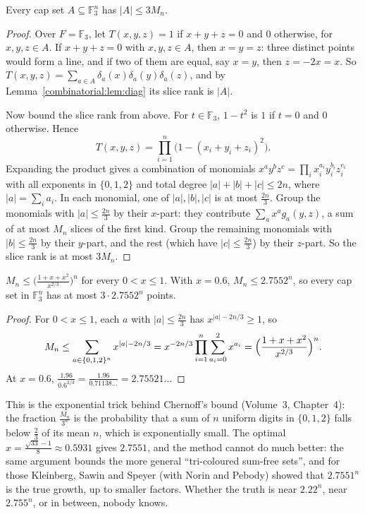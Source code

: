 \begin{theorem}\label{combinatorial:thm:capset}
Every cap set $A\subseteq\mathbb F_3^n$ has $|A|\le3M_n$.
\end{theorem}
\begin{proof}
Over $F=\mathbb F_3$, let $T(x,y,z)=1$ if $x+y+z=0$ and $0$ otherwise, for $x,y,z\in A$. If $x+y+z=0$ with $x,y,z\in A$, then $x=y=z$: three distinct points would form a line, and if two of them are equal,
say $x=y$, then $z=-2x=x$. So $T(x,y,z)=\sum_{a\in A}\delta_a(x)\delta_a(y)\delta_a(z)$, and by Lemma~\ref{combinatorial:lem:diag} its slice rank is $|A|$.

Now bound the slice rank from above. For $t\in\mathbb F_3$, $1-t^2$ is $1$ if $t=0$ and $0$ otherwise. Hence
\[
T(x,y,z)=\prod_{i=1}^n\bigl(1-(x_i+y_i+z_i)^2\bigr).
\]
Expanding the product gives a combination of monomials $x^ay^bz^c=\prod_ix_i^{a_i}y_i^{b_i}z_i^{c_i}$ with all exponents in $\{0,1,2\}$ and total degree $|a|+|b|+|c|\le2n$, where $|a|=\sum_ia_i$. In each
monomial, one of $|a|,|b|,|c|$ is at most $\frac{2n}3$. Group the monomials with $|a|\le\frac{2n}3$ by their $x$-part: they contribute $\sum_ax^ag_a(y,z)$, a sum of at most $M_n$ slices of the first kind. Group the
remaining monomials with $|b|\le\frac{2n}3$ by their $y$-part, and the rest (which have $|c|\le\frac{2n}3$) by their $z$-part. So the slice rank is at most $3M_n$.
\end{proof}

\begin{proposition}\label{combinatorial:prop:mn}
$M_n\le\bigl(\frac{1+x+x^2}{x^{2/3}}\bigr)^n$ for every $0<x\le1$. With $x=0.6$, $M_n\le2.7552^n$, so every cap set in $\mathbb F_3^n$ has at most $3\cdot2.7552^n$ points.
\end{proposition}
\begin{proof}
For $0<x\le1$, each $a$ with $|a|\le\frac{2n}3$ has $x^{|a|-2n/3}\ge1$, so
\[
M_n\le\sum_{a\in\{0,1,2\}^n}x^{|a|-2n/3}=x^{-2n/3}\prod_{i=1}^n\sum_{a_i=0}^2x^{a_i}=\Bigl(\frac{1+x+x^2}{x^{2/3}}\Bigr)^n.
\]
At $x=0.6$, $\frac{1.96}{0.6^{2/3}}=\frac{1.96}{0.71138\ldots}=2.75521\ldots$
\end{proof}

This is the exponential trick behind Chernoff's bound (Volume~3, Chapter~4): the fraction $\frac{M_n}{3^n}$ is the probability that a sum of $n$ uniform digits in $\{0,1,2\}$ falls below $\frac23$ of its mean $n$,
which is exponentially small. The optimal $x=\frac{\sqrt{33}-1}8\approx0.5931$ gives $2.7551$, and the method cannot do much better: the same argument bounds the more general ``tri-coloured sum-free sets'', and for those Kleinberg, Sawin and Speyer (with Norin and Pebody) showed that
$2.7551^n$ is the true growth, up to smaller factors.
Whether the truth is near $2.22^n$, near $2.755^n$, or in between, nobody knows.

